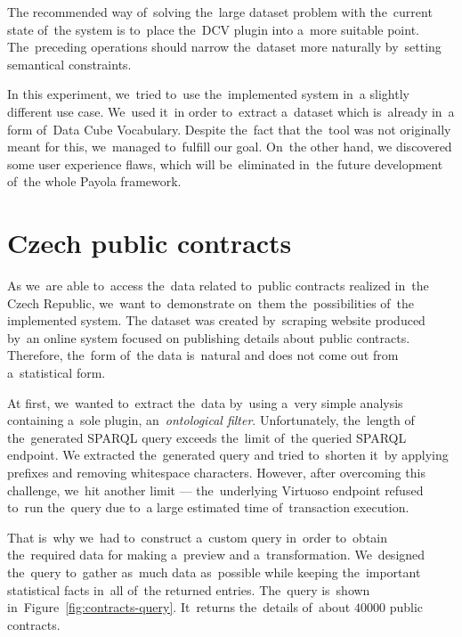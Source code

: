 The recommended way of~solving the~large dataset problem with the~current state of~the system
is to~place the~DCV 
plugin into a~more suitable point. The~preceding operations should narrow the~dataset more naturally by~setting semantical constraints.

In this experiment, we~tried to~use the~implemented system in~a slightly 
different use case. We~used it~in order to~extract a~dataset which is~already in~a form of~Data Cube Vocabulary. Despite the~fact that the~tool was not 
originally meant for this, we~managed to~fulfill our goal. On~the other hand, 
we discovered some user experience flaws, which will be~eliminated in~the future 
development of~the whole Payola framework.

\section{Czech public contracts}
As we~are able to~access the~data related to~public contracts realized in~the 
Czech Republic, we~want to~demonstrate on~them the~possibilities of~the implemented system.
The dataset was created by~scraping website produced by~an online system focused 
on publishing details about public contracts. Therefore, the~form of~the data is~natural and does not come out from a~statistical form.

At first, we~wanted to~extract the~data by~using a~very simple analysis
containing a~sole plugin, an~\emph{ontological filter}. Unfortunately, the~length
of the~generated SPARQL query exceeds the~limit of~the queried SPARQL endpoint.
We extracted the~generated query and tried to~shorten it~by applying prefixes 
and removing whitespace characters. However, after overcoming this challenge, we~hit another limit --- the~underlying Virtuoso endpoint refused to~run the~query 
due to~a large estimated time of~transaction execution.

That is~why we~had to~construct a~custom query in~order to~obtain the~required 
data for making a~preview and a~transformation. We~designed the~query to~gather as~much data as~possible while keeping the~important statistical facts in~all of~the returned entries. The~query is~shown in~Figure~\ref{fig:contracts-query}. It~returns the~details of~about $40000$ public 
contracts.

